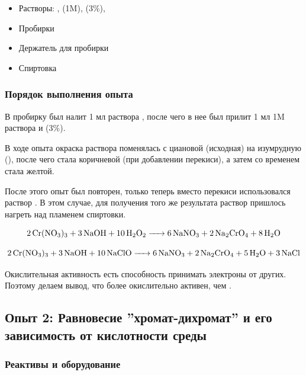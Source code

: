 \documentclass[a4paper, 12pt]{article}
\begin{document}
\begin{itemize}
	\item Растворы: ,  (1M),  (3\%), 
	
	\item Пробирки
	
	\item Держатель для пробирки
	
	\item Спиртовка 
\end{itemize}

\subsubsection{Порядок выполнения опыта}

В пробирку был налит 1 мл раствора , после чего в нее был прилит 1 мл 1M раствора  и  (3\%).

В ходе опыта окраска раствора поменялась с циановой (исходная) на изумрудную (), после чего стала коричневой (при добавлении перекиси), а затем со временем стала желтой. 

После этого опыт был повторен, только теперь вместо перекиси использовался раствор . В этом случае, для получения того же результата раствор пришлось нагреть над пламенем спиртовки.

\begin{equation}
	\ce{2 Cr(NO3)3 + 3 NaOH + 10 H2O2 -> 6 NaNO3 + 2 Na2CrO4 + 8 H2O} 
\end{equation}

\begin{equation}
	\ce{2 Cr(NO3)3 + 3 NaOH + 10 NaClO -> 6 NaNO3 + 2 Na2CrO4 + 5 H2O + 3NaCl} 
\end{equation}

Окислительная активность есть способность принимать электроны от других. Поэтому делаем вывод, что  более окислительно активен, чем .

\subsection{Опыт 2: Равновесие ''хромат-дихромат'' и его зависимость от кислотности среды}

\subsubsection{Реактивы и оборудование}
\end{document}
